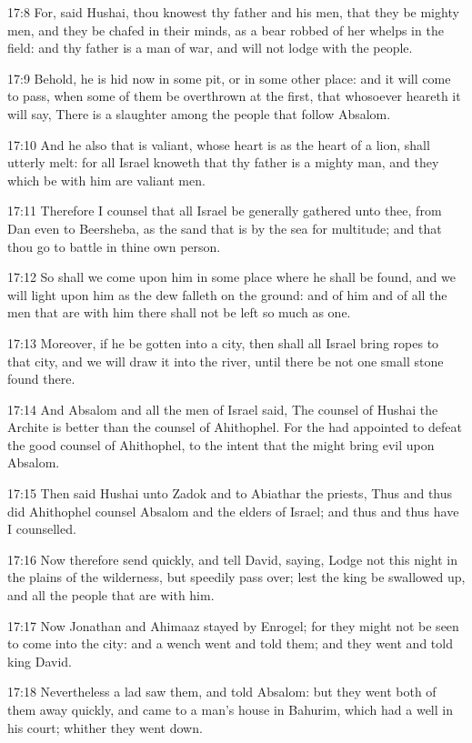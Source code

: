 17:8 For, said Hushai, thou knowest thy father and his men, that they
be mighty men, and they be chafed in their minds, as a bear robbed of
her whelps in the field: and thy father is a man of war, and will not
lodge with the people.

17:9 Behold, he is hid now in some pit, or in some other place: and it
will come to pass, when some of them be overthrown at the first, that
whosoever heareth it will say, There is a slaughter among the people
that follow Absalom.

17:10 And he also that is valiant, whose heart is as the heart of a
lion, shall utterly melt: for all Israel knoweth that thy father is a
mighty man, and they which be with him are valiant men.

17:11 Therefore I counsel that all Israel be generally gathered unto
thee, from Dan even to Beersheba, as the sand that is by the sea for
multitude; and that thou go to battle in thine own person.

17:12 So shall we come upon him in some place where he shall be found,
and we will light upon him as the dew falleth on the ground: and of
him and of all the men that are with him there shall not be left so
much as one.

17:13 Moreover, if he be gotten into a city, then shall all Israel
bring ropes to that city, and we will draw it into the river, until
there be not one small stone found there.

17:14 And Absalom and all the men of Israel said, The counsel of
Hushai the Archite is better than the counsel of Ahithophel. For the
\LORD had appointed to defeat the good counsel of Ahithophel, to the
intent that the \LORD might bring evil upon Absalom.

17:15 Then said Hushai unto Zadok and to Abiathar the priests, Thus
and thus did Ahithophel counsel Absalom and the elders of Israel; and
thus and thus have I counselled.

17:16 Now therefore send quickly, and tell David, saying, Lodge not
this night in the plains of the wilderness, but speedily pass over;
lest the king be swallowed up, and all the people that are with him.

17:17 Now Jonathan and Ahimaaz stayed by Enrogel; for they might not
be seen to come into the city: and a wench went and told them; and
they went and told king David.

17:18 Nevertheless a lad saw them, and told Absalom: but they went
both of them away quickly, and came to a man's house in Bahurim, which
had a well in his court; whither they went down.

